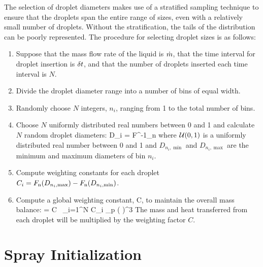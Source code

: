 The selection of droplet diameters makes use of a stratified sampling technique to ensure that the droplets span the entire range of sizes, even with a relatively small number of droplets. Without the stratification, the tails of the distribution can be poorly represented. The procedure for selecting droplet sizes is as follows:
\begin{enumerate}
\item Suppose that the mass flow rate of the liquid is $\dot{m}$, that the time interval for droplet insertion is $\delta t$, and that the number of droplets inserted each time interval is $N$.
\item Divide the droplet diameter range into a number of bins of equal width.
\item Randomly choose $N$ integers, $n_i$, ranging from 1 to the total number of bins.
\item Choose $N$ uniformly distributed real numbers between 0 and 1 and calculate $N$ random droplet diameters:
\be
   D_i = F^{-1}_{\rm n}  \label{Ud_strat}
\ee
where ${\cal U}(0,1)$ is a uniformly distributed real number between 0 and 1 and $D_{n_i,\min}$ and $D_{n_i,\max}$ are the minimum and maximum diameters of bin $n_i$.
\item Compute weighting constants for each droplet $C_i = F_{\rm n}(D_{n_i,\max}) - F_{\rm n}(D_{n_i,\min})$.
\item Compute a global weighting constant, C, to maintain the overall mass balance:
    \be \dm \; \dt = C \, \sum_{i=1}^N \; C_i \;  \pi \rho_{\rm p}
      \left(  \right)^3
    \ee
    The mass and heat transferred from each droplet will be multiplied by the weighting factor $C$.
\end{enumerate}


\section{Spray Initialization}

